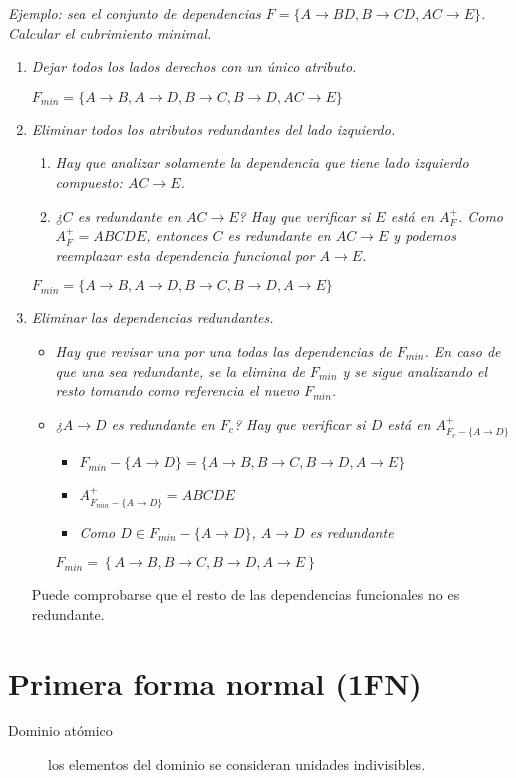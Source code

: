 \documentclass[a4paper, twoside]{article}
\begin{document}
\emph{Ejemplo: sea el conjunto de dependencias $F=\{A\to BD,B\to CD,AC\to E\}$. Calcular el cubrimiento minimal.}
\begin{enumerate}
	\item \emph{Dejar todos los lados derechos con un único atributo.}
	
	\emph{$F_{min}=\{A\to B,A\to D,B\to C,B\to D,AC\to E\}$}

	\item \emph{Eliminar todos los atributos redundantes del lado izquierdo.}
	\begin{enumerate}
		\item \emph{Hay que analizar solamente la dependencia que tiene lado izquierdo compuesto: $AC\to E$.}
		\item \emph{¿$C$ es redundante en $AC\to E$? Hay que verificar si $E$ está en $A_{F}^{+}$. Como $A_{F}^{+}=ABCDE$, entonces $C$ es redundante en $AC\to E$ y podemos reemplazar esta dependencia funcional por
$A\to E$.}
	\end{enumerate}

	\emph{$F_{min}=\{A\to B,A\to D,B\to C,B\to D,A\to E\}$}

	\item \emph{Eliminar las dependencias redundantes.}
	\begin{itemize}
		\item \emph{Hay que revisar una por una todas las dependencias de $F_{min}$. En caso de que una sea redundante, se la elimina de $F_{min}$ y se sigue analizando el resto tomando como referencia el nuevo $F_{min}$. }
		\item \emph{¿$A\to D$ es redundante en $F_{c}$? Hay que verificar si $D$ está en $A_{F_{c}-\{A\to D\}}^{+}$}
		\begin{itemize}
			\item \emph{$F_{min}-\{A\to D\}=\{A\to B,B\to C,B\to D,A\to E\}$}
			\item \emph{$A_{F_{min}-\{A\to D\}}^{+}=ABCDE$}
			\item \emph{Como $D\in F_{min}-\{A\to D\}$, $A\to D$ es redundante}
		\end{itemize}

		$F_{min}=\left\{ A\to B,B\to C,B\to D,A\to E\right\} $
	\end{itemize}

	Puede comprobarse que el resto de las dependencias funcionales no es redundante.
\end{enumerate}

\section{Primera forma normal (1FN)}
\begin{description}
	\item[Dominio atómico] los elementos del dominio se consideran unidades indivisibles.
\end{description}
\end{document}
